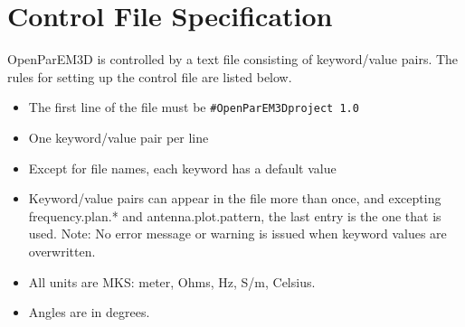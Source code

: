 \documentclass[titlepage]{article}
\renewcommand\_{\textunderscore\linebreak[1]}
\begin{document}
\appendix

\newpage
\section{Control File Specification}
\label{sec:control_file_spec}

OpenParEM3D is controlled by a text file consisting of keyword/value pairs.  The rules for setting up the control file are listed below.
\begin{itemize}[nosep]
  \item The first line of the file must be \verb+#OpenParEM3Dproject 1.0+
  \item One keyword/value pair per line
  \item Except for file names, each keyword has a default value
  \item Keyword/value pairs can appear in the file more than once, and excepting frequency.plan.* and antenna.plot.pattern, the last entry is the one that is used.  Note: No error message or warning is issued when keyword values are overwritten.
  \item All units are MKS: meter, Ohms, Hz, S/m, Celsius.
  \item Angles are in degrees.
\end{itemize}
\end{document}
